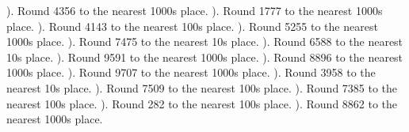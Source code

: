 \documentclass{article}%
\begin{document}
). Round 4356 to the nearest 1000s place.%
\newline%
\newline%
). Round 1777 to the nearest 1000s place.%
\newline%
\newline%
). Round 4143 to the nearest 100s place.%
\newline%
\newline%
). Round 5255 to the nearest 1000s place.%
\newline%
\newline%
). Round 7475 to the nearest 10s place.%
\newline%
\newline%
). Round 6588 to the nearest 10s place.%
\newline%
\newline%
). Round 9591 to the nearest 1000s place.%
\newline%
\newline%
). Round 8896 to the nearest 1000s place.%
\newline%
\newline%
). Round 9707 to the nearest 1000s place.%
\newline%
\newline%
). Round 3958 to the nearest 10s place.%
\newline%
\newline%
). Round 7509 to the nearest 100s place.%
\newline%
\newline%
). Round 7385 to the nearest 100s place.%
\newline%
\newline%
). Round 282 to the nearest 100s place.%
\newline%
\newline%
). Round 8862 to the nearest 1000s place.%
\end{document}

